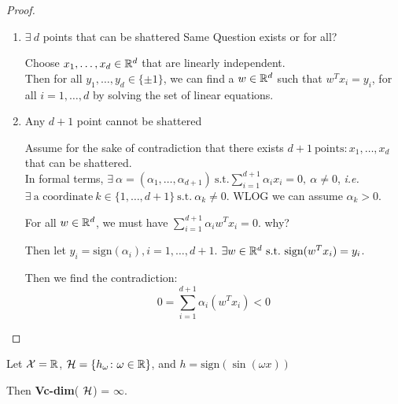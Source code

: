 \begin{proof}
    \begin{enumerate}
        \item \(\exists \ d\) points that can be shattered \color{red} Same Question exists or for all?
        
        \color{black} Choose \(x_1, \ldots, x_d \in \mathbb{R}^d\) that are linearly independent. \\ 
        Then for all \(y_1, \ldots, y_d \in \{\pm 1\}\), we can find a \(w \in \mathbb{R}^d\) such that 
        \(w^T x_i = y_i\), for all \(i=1,\ldots, d\) by solving the set of linear equations. 
        
        \item Any \(d+1\) point cannot be shattered  
        
        Assume for the sake of contradiction that there exists \(d+1 \ \text{points} \colon 
        x_1, \ldots, x_d\) that can be shattered. \\ 
        In formal terms, \(\exists \  \alpha = (\alpha_1, \ldots, \alpha_{d+1})  \ \text{s.t.} 
        \sum_{i=1}^{d+1} \alpha_i x_i = 0,\  \alpha \neq 0\), \emph{i.e.} \(\exists \ 
        \text{a coordinate} \ k \in \{ 1,\ldots, d+1\} \ \text{s.t.} \ \alpha_k \neq 0\). 
        WLOG we can assume \(\alpha_k > 0\).  
        
        For all \(w \in \mathbb{R}^d\), we must have 
        \(\sum_{i=1}^{d+1} \alpha_i w^T x_i = 0\).  \color{red} why? 

        \color{black} Then let \(y_i = \text{sign}(\alpha_i), i=1,\ldots,d+1\). \(\exists w
        \in \mathbb{R}^d \ \text{s.t.} \ \text{sign}(w^T x_i) = y_i\). 

        Then we find the contradiction: 
        \[
            0 = \sum_{i=1}^{d+1} \alpha_i (w^T x_i) < 0 \tag*{opposite sign}
        \]
    \end{enumerate}
\end{proof}


\begin{eg}
    Let \(\mathcal{X} = \mathbb{R}\), \(\mathcal{H} = \{h_\omega \colon \omega \in \mathbb{R}\}\), and 
    \(h = \text{sign}\left(\sin(\omega x)\right)\)

    Then \textbf{Vc-dim}( \(\mathcal{H}\)) = \(\infty\). 
\end{eg}

